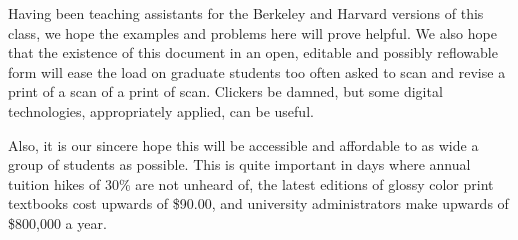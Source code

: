 Having been teaching assistants for the Berkeley and Harvard versions of this class, we hope the examples and problems here will prove helpful.  We also hope that the existence of this document in an open, editable and possibly reflowable form will ease the load on graduate students too often asked to scan and revise a print of a scan of a print of scan.  Clickers be damned, but some digital technologies, appropriately applied, can be useful.

Also, it is our sincere hope this will be accessible and affordable to as wide a group of students as possible.  This is quite important in days where annual tuition hikes of 30\% are not unheard of, the latest editions of glossy color print textbooks cost upwards of \$90.00, and university administrators make upwards of \$800,000 a year. 

